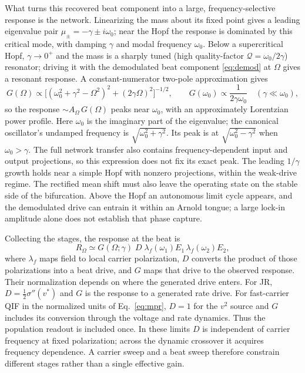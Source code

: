 \documentclass[11pt,a4paper]{article}
\newcommand{\Sig}{\sigma}
\newcommand{\half}{\tfrac{1}{2}}
\begin{document}
What turns this recovered beat component into a large, frequency-selective response is
the network. Linearizing the mass about its fixed point gives a leading eigenvalue pair
$\mu_\pm=-\gamma\pm i\omega_0$; near the Hopf the response is dominated by this critical
mode, with damping $\gamma$ and modal frequency $\omega_0$.
Below a supercritical Hopf, $\gamma\to0^+$ and
the mass is a sharply tuned (high quality-factor $\mathcal{Q}=\omega_0/2\gamma$) resonator;
driving it with the demodulated beat component
\eqref{eq:demod} at $\Omega$ gives a resonant response. A constant-numerator
two-pole approximation gives
\begin{equation}
G(\Omega)\propto\big[(\omega_0^2+\gamma^2-\Omega^2)^2+(2\gamma\Omega)^2\big]^{-1/2},
\qquad G(\omega_0)\propto\frac{1}{2\gamma\omega_0}
\quad(\gamma\ll\omega_0),
\label{eq:gain}
\end{equation}
so the response $\sim A_\Omega\,G(\Omega)$ peaks near $\omega_0$, with an
approximately Lorentzian power profile. Here $\omega_0$ is the imaginary part of
the eigenvalue; the canonical oscillator's undamped frequency is
$\sqrt{\omega_0^2+\gamma^2}$. Its peak is at $\sqrt{\omega_0^2-\gamma^2}$ when
$\omega_0>\gamma$. The full network transfer also contains frequency-dependent
input and output projections, so this expression does not fix its exact peak.
The leading $1/\gamma$ growth holds near a simple Hopf with nonzero projections,
within the weak-drive regime. The rectified mean shift must also leave the operating
state on the stable side of the bifurcation. Above the Hopf an autonomous limit cycle appears,
and the demodulated drive can entrain it within an Arnold tongue; a large lock-in
amplitude alone does not establish that phase capture.

Collecting the stages, the response at the beat is
\begin{equation}
R_\Omega\simeq G(\Omega;\gamma)\;D\;\lambda_f(\omega_1)E_1\,\lambda_f(\omega_2)E_2 ,
\label{eq:receiver}
\end{equation}
where $\lambda_f$ maps field to local carrier polarization, $D$ converts the
product of those polarizations into a beat drive, and $G$ maps that drive to the
observed response. Their normalization depends on where the generated drive enters.
For JR, $D=\half\Sig''(v^*)$ and $G$ is the response to a generated rate drive.
For fast-carrier QIF in the normalized units of Eq.~\eqref{eq:mpr}, $D=1$ for
the $v^2$ source and $G$ includes its conversion through the voltage and rate
dynamics. Thus the population readout is included once. In these limits $D$ is
independent of carrier frequency at fixed polarization; across the dynamic
crossover it acquires frequency dependence. A carrier sweep and a beat sweep
therefore constrain different stages rather than a single effective gain.
\end{document}
